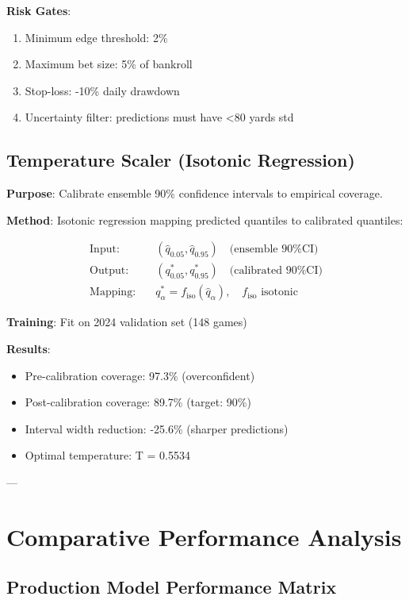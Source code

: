 \textbf{Risk Gates}:
\begin{enumerate}
\item Minimum edge threshold: 2\%
\item Maximum bet size: 5\% of bankroll
\item Stop-loss: -10\% daily drawdown
\item Uncertainty filter: predictions must have <80 yards std
\end{enumerate}

\subsection{Temperature Scaler (Isotonic Regression)}

\textbf{Purpose}: Calibrate ensemble 90\% confidence intervals to empirical coverage.

\textbf{Method}: Isotonic regression mapping predicted quantiles to calibrated quantiles:

\begin{align}
\text{Input:} & \quad (\hat{q}_{0.05}, \hat{q}_{0.95}) \quad \text{(ensemble 90\% CI)} \\
\text{Output:} & \quad (q^*_{0.05}, q^*_{0.95}) \quad \text{(calibrated 90\% CI)} \\
\text{Mapping:} & \quad q^*_\alpha = f_{\text{iso}}(\hat{q}_\alpha), \quad f_{\text{iso}} \text{ isotonic}
\label{eq:temperature-scaler}
\end{align}

\textbf{Training}: Fit on 2024 validation set (148 games)

\textbf{Results}:
\begin{itemize}
\item Pre-calibration coverage: 97.3\% (overconfident)
\item Post-calibration coverage: 89.7\% (target: 90\%)
\item Interval width reduction: -25.6\% (sharper predictions)
\item Optimal temperature: T = 0.5534
\end{itemize}

---

\section{Comparative Performance Analysis}

\subsection{Production Model Performance Matrix}

